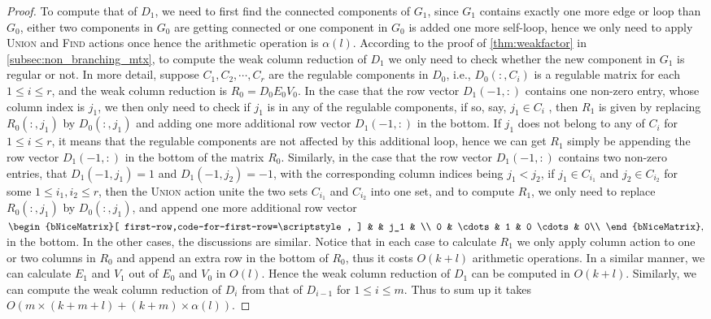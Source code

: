 \documentclass{article}
\theoremstyle{definition}
\begin{document}
\begin{proof}
To compute that of $D_1$, 
we need to first find the connected components of $G_1$,
since $G_1$ contains exactly one more edge or loop than $G_0$,
either two components in $G_0$ are getting connected or one component in $G_0$ is added one more self-loop,
hence we only need to apply \textsc{Union} and \textsc{Find} actions once hence the arithmetic operation is $\alpha(l)$.
According to the proof of \cref{thm:weakfactor} in \cref{subsec:non_branching_mtx},
to compute the weak column reduction of $D_1$ we only need to check whether the new component in $G_1$ is regular or not.
In more detail,
suppose $C_1, C_2, \cdots, C_r$ are the regulable components in $D_0$,
i.e.,
$D_0(:, C_i)$ is a regulable matrix for each $1\leq i\leq r$,
and the weak column reduction is $R_0=D_0 E_0 V_0$.
In the case that the row vector $D_1(-1, :)$ contains one non-zero entry,
whose column index is $j_1$,
we then only need to check if $j_1$ is in any of the regulable components,
if so,
say,
$j_1\in C_i$
,
then $R_1$ is given by replacing $R_0(:, j_1)$ by $D_0(:, j_1)$ and 
adding one more additional row vector $D_1(-1, :)$ in the bottom.
If $j_1$ does not belong to any of $C_i$ for $1\leq i\leq r$,
it means that the regulable components are not affected by this additional loop,
hence we can get $R_1$ simply be appending the row vector $D_1(-1, :)$ in the bottom of the matrix $R_0$.
Similarly,
in the case that the row vector $D_1(-1, :)$ contains two non-zero entries,
that $D_1(-1, j_1)=1$ and $D_1(-1, j_2)=-1$,
with the corresponding column indices being $j_1 < j_2$,
if $j_1\in C_{i_1}$ and $j_2\in C_{i_2}$ for some $1\leq i_1, i_2\leq r$,
then the \textsc{Union} action unite the two sets $C_{i_1}$ and $C_{i_2}$ into one set,
and to compute $R_1$,
we only need to replace $R_0(:, j_1)$ by $D_{0}(:, j_1)$,
and append one more additional row vector 
$\begin{bNiceMatrix}[
  first-row,code-for-first-row=\scriptstyle,
]
   &            & j_1 &  \\
0 & \cdots & 1   & 0  \cdots & 0\\
\end{bNiceMatrix},$
in the bottom.
In the other cases,
the discussions are similar.
Notice that in each case to calculate $R_1$ we only apply column action to one or two columns in $R_0$ and append an extra row in the bottom of $R_0$,
thus it costs $O(k+l)$ arithmetic operations.
In a similar manner,
we can calculate $E_1$ and $V_1$ out of $E_0$ and $V_0$ in $O(l)$.
Hence the weak column reduction of $D_1$ can be computed in $O(k+l)$.
Similarly,
we can compute the weak column reduction of $D_i$ from that of $D_{i-1}$ for $1\leq i\leq m$.
Thus to sum up it takes $O\left(m\times (k+m+l) + (k+m)\times \alpha(l)\right)$.
\end{proof}
\end{document}
